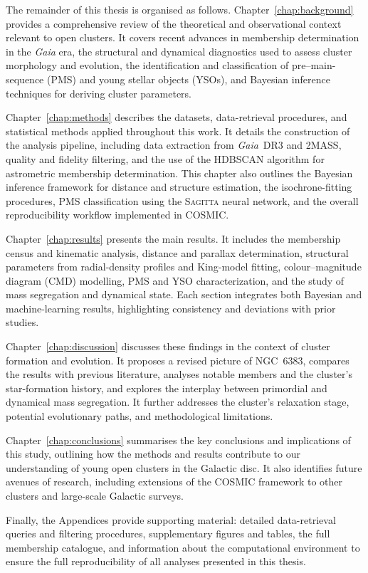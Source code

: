 \documentclass[../main.tex]{subfiles}
\begin{document}
The remainder of this thesis is organised as follows. 
Chapter~\ref{chap:background} provides a comprehensive review of the theoretical and observational context relevant to open clusters. It covers recent advances in membership determination in the \textit{Gaia} era, the structural and dynamical diagnostics used to assess cluster morphology and evolution, the identification and classification of pre–main-sequence (PMS) and young stellar objects (YSOs), and Bayesian inference techniques for deriving cluster parameters.

Chapter~\ref{chap:methods} describes the datasets, data-retrieval procedures, and statistical methods applied throughout this work. It details the construction of the analysis pipeline, including data extraction from \textit{Gaia}~DR3 and 2MASS, quality and fidelity filtering, and the use of the \textsc{HDBSCAN} algorithm for astrometric membership determination. This chapter also outlines the Bayesian inference framework for distance and structure estimation, the isochrone-fitting procedures, PMS classification using the \textsc{Sagitta} neural network, and the overall reproducibility workflow implemented in \textsc{COSMIC}.

Chapter~\ref{chap:results} presents the main results. It includes the membership census and kinematic analysis, distance and parallax determination, structural parameters from radial-density profiles and King-model fitting, colour–magnitude diagram (CMD) modelling, PMS and YSO characterization, and the study of mass segregation and dynamical state. Each section integrates both Bayesian and machine-learning results, highlighting consistency and deviations with prior studies.

Chapter~\ref{chap:discussion} discusses these findings in the context of cluster formation and evolution. It proposes a revised picture of NGC~6383, compares the results with previous literature, analyses notable members and the cluster’s star-formation history, and explores the interplay between primordial and dynamical mass segregation. It further addresses the cluster’s relaxation stage, potential evolutionary paths, and methodological limitations.

Chapter~\ref{chap:conclusions} summarises the key conclusions and implications of this study, outlining how the methods and results contribute to our understanding of young open clusters in the Galactic disc. It also identifies future avenues of research, including extensions of the \textsc{COSMIC} framework to other clusters and large-scale Galactic surveys.

Finally, the Appendices provide supporting material: detailed data-retrieval queries and filtering procedures, supplementary figures and tables, the full membership catalogue, and information about the computational environment to ensure the full reproducibility of all analyses presented in this thesis.
\biblio %
\end{document}
